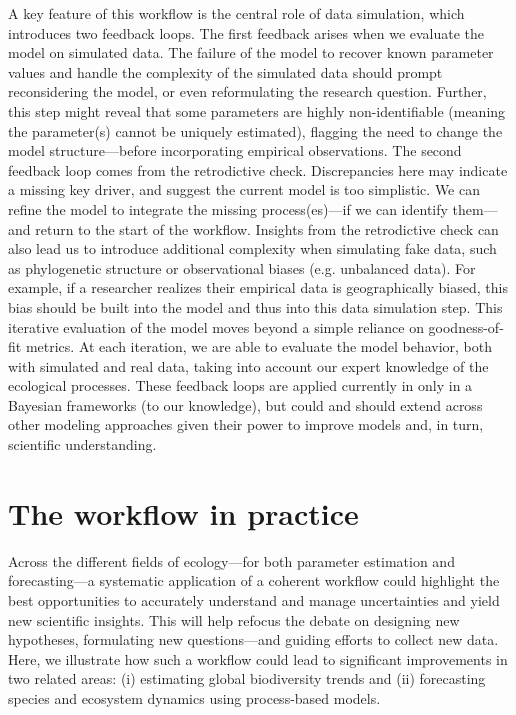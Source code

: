 \documentclass[11pt]{article}
\newcommand{\llabel}[1]{\hypertarget{lintarget:#1}{}\linelabel{lin:#1}}
\begin{document}
A key feature of this workflow is the central role of data simulation, which introduces two feedback loops.
The first feedback arises when we evaluate the model on simulated data.
The failure of the model to recover known parameter values and handle the complexity of the simulated data should prompt reconsidering the model, or even reformulating the research question.
Further, this step might reveal that some parameters are highly non-identifiable (meaning the parameter(s) cannot be uniquely estimated),
flagging the need to change the model structure---before incorporating empirical observations. 
The second feedback loop comes from the retrodictive check. 
Discrepancies here may indicate a missing key driver, and suggest the current model is too simplistic. We can refine the model to integrate the missing process(es)---if we can identify them---and return to the start of the workflow. Insights from the retrodictive check can also lead us to introduce additional complexity when simulating fake data, such as phylogenetic structure or observational biases (e.g. unbalanced data). For example, if a researcher realizes their empirical data is geographically biased, this bias should be built into the model and thus into this data simulation step. This iterative evaluation of the model moves beyond a simple reliance on goodness-of-fit metrics. At each iteration, we are able to evaluate the model behavior, both with simulated and real data, taking into account our expert knowledge of the ecological processes. \llabel{broadcontext}These feedback loops are applied currently in only in a Bayesian frameworks (to our knowledge), but could and should extend across other modeling approaches given their power to improve models and, in turn, scientific understanding.

\section{The workflow in practice}

Across the different fields of ecology---for both parameter estimation and forecasting---a systematic application of a coherent workflow could highlight the best opportunities to accurately \llabel{quant1}understand and manage uncertainties and yield new scientific insights. This will help refocus the debate on designing new hypotheses, formulating new questions---and guiding efforts to collect new data. Here, we illustrate how such a workflow could lead to significant improvements in two related areas: (i) estimating global biodiversity trends and (ii) forecasting species and ecosystem dynamics using process-based models.
\end{document}
